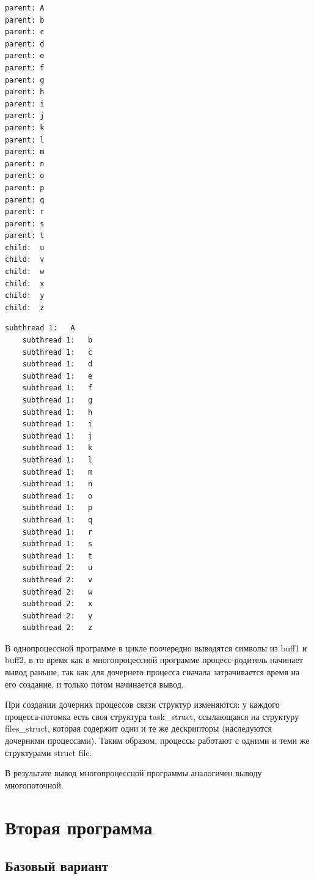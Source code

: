 \documentclass[a4paper,14pt]{extarticle}
\begin{document}
\begin{lstlisting}[caption={\text{Вывод программы}}]
parent: A
parent: b
parent: c
parent: d
parent: e
parent: f
parent: g
parent: h
parent: i
parent: j
parent: k
parent: l
parent: m
parent: n
parent: o
parent: p
parent: q
parent: r
parent: s
parent: t
child:  u
child:  v
child:  w
child:  x
child:  y
child:  z
\end{lstlisting}



\begin{lstlisting}[caption={\text{Вывод программы}}]
	subthread 1:   A
	subthread 1:   b
	subthread 1:   c
	subthread 1:   d
	subthread 1:   e
	subthread 1:   f
	subthread 1:   g
	subthread 1:   h
	subthread 1:   i
	subthread 1:   j
	subthread 1:   k
	subthread 1:   l
	subthread 1:   m
	subthread 1:   n
	subthread 1:   o
	subthread 1:   p
	subthread 1:   q
	subthread 1:   r
	subthread 1:   s
	subthread 1:   t
	subthread 2:   u
	subthread 2:   v
	subthread 2:   w
	subthread 2:   x
	subthread 2:   y
	subthread 2:   z
\end{lstlisting}

В однопроцессной программе в цикле поочередно выводятся символы из buff1 и buff2, в то время как в многопроцессной
программе процесс-родитель начинает вывод раньше, так как для дочернего процесса сначала затрачивается время на его создание, и только потом начинается вывод.

При создании дочерних процессов связи структур изменяются: у каждого процесса-потомка есть своя структура task\_struct, ссылающаяся на структуру files\_struct, которая содержит одни и те же дескрипторы (наследуются дочерними процессами). Таким образом, процессы работают с одними и теми же структурами struct file.

В результате вывод многопроцессной программы аналогичен выводу многопоточной.



\section{Вторая программа}

\subsection{Базовый вариант}


\end{document}
